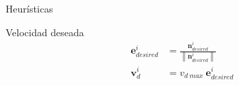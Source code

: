 \begin{frame}{Heurísticas}
    \begin{block}{Velocidad deseada}
        \begin{equation*}
            \begin{aligned}
                \mathbf{e}_{desired}^i &= \frac{\mathbf{n}_{desired}^i}{\left\| \mathbf{n}_{desired}^i \right\|} \\
                \mathbf{v}_{d}^i &= v_{d\ max}\ \mathbf{e}_{desired}^i
            \end{aligned}
        \end{equation*}
    \end{block}
\end{frame}




